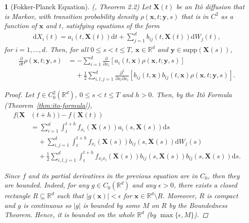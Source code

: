 \documentclass[english]{article}
\numberwithin{equation}{section}
\numberwithin{figure}{section}
\theoremstyle{bolddescit}
\newtheorem{theorem}{\protect\theoremname}[section]
\theoremstyle{definition}
\theoremstyle{definition}
\theoremstyle{plain}
\theoremstyle{plain}
\theoremstyle{bolddesc}
\theoremstyle{plain}
\theoremstyle{remark}
\providecommand{\theoremname}{Theorem}
\begin{document}
\begin{theorem}[Fokker-Planck Equation]\label{thm:fokker-planck}
  (\cite{pavliotis_stochastic_2014}, Theorem 2.2)
  Let $\mathbf{X}(t)$ be an It\^o diffusion that is Markov, with transition probability density $\rho(\mathbf{x},t;\mathbf{y},s)$ that is in $C^2$ as a function of $\mathbf{x}$ and $t$, satisfying equations of the form
  \begin{align*}
    \mathrm{d}X_i(t) = a_i(t, \mathbf{X}(t)) \mathrm{d}t + \sum_{j=1}^d b_{ij}(t, \mathbf{X}(t)) \mathrm{d}W_j(t),
  \end{align*}
  for $i=1,\ldots,d$. Then, for all $0 \le s < t \le T$, $\mathbf{x} \in \mathbb{R}^d$ and $\mathbf{y} \in \mathrm{supp}(\mathbf{X}(s))$,
  \begin{align*}
    \frac{\partial}{\partial t}\rho(\mathbf{x},t;\mathbf{y},s)
    &= - \sum_{i=1}^d \frac{\partial}{\partial x_i}[a_i(t,\mathbf{x})\rho(\mathbf{x},t;\mathbf{y},s)]\\
      &\ \ \ \ \ + \frac{1}{2} \sum_{i,l,j=1}^{d} \frac{\partial^2}{\partial x_l \partial x_i}[b_{ij}(t,\mathbf{x}) b_{lj}(t,\mathbf{x}) \rho(\mathbf{x},t;\mathbf{y},s)].
  \end{align*}

  \begin{proof}
    Let $f \in C^2_0(\mathbb{R}^d)$, $0 \le s < t \le T$ and $h > 0$. Then, by the It\^o Formula (Theorem~\ref{thm:ito-formula}),
    \begin{align*}
      f(\mathbf{X}&(t+h)) - f(\mathbf{X}(t))\\
      &= \sum_{i=1}^{d} \int_t^{t+h} f_{x_i}(\mathbf{X}(s)) a_i(s,\mathbf{X}(s)) \mathrm{d}s\\
        &\ \ \ \ \ + \sum_{i,j=1}^{d} \int_t^{t+h} f_{x_i}(\mathbf{X}(s)) b_{ij}(s,\mathbf{X}(s)) \mathrm{d}W_j(s)\\
        &\ \ \ \ \ + \frac{1}{2} \sum_{i,l,j=1}^{d} \int_t^{t+h} f_{x_i x_l}(\mathbf{X}(s)) b_{ij}(s,\mathbf{X}(s)) b_{lj}(s,\mathbf{X}(s)) \mathrm{d}s.
    \end{align*}

    Since $f$ and its partial derivatives in the previous equation are in $C_0$, then they are bounded. Indeed, for any $g \in C_0(\mathbb{R}^d)$ and any $\epsilon > 0$, there exists a closed rectangle $R \subseteq \mathbb{R}^d$ such that $|g(\mathbf{x})| < \epsilon$ for $\mathbf{x} \in \mathbb{R}^d \setminus R$. Moreover, $R$ is compact and $g$ is continuous so $|g|$ is bounded by some $M$ on $R$ by the Boundedness Theorem. Hence, it is bounded on the whole $\mathbb{R}^d$ (by $\max\{\epsilon, M\}$).


\end{proof}
\end{theorem}
\end{document}
